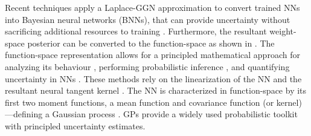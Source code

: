 \documentclass{article}
\makeatletter
\newcommand{\eg}{\textit{e.g.\@}\xspace}
\newcommand{\our}{\textsc{sfr}\xspace}
\makeatother
\begin{document}
\begin{figure}[t!]
  \vspace*{-1em}
\end{figure}


Recent techniques  \citep[\eg,][]{ritter2018kfac,khan2019approximate,daxberger2021laplace,fortuin2021bayesian,immer2021scalable} apply a Laplace-GGN approximation to convert trained NNs into Bayesian neural networks (BNNs), that can provide uncertainty without sacrificing additional resources to training \citep{foong2019between}. Furthermore, the resultant weight-space posterior can be converted to the function-space as shown in \citet{khan2019approximate, immer2021improving}. The function-space representation allows for a principled mathematical approach for analyzing its behaviour \citep{cho2009kernel,meronen2020stationary}, performing probabilistic inference \citep{khan2019approximate}, and quantifying uncertainty in NNs \citep{foong2019between}. These methods rely on the linearization of the NN and the resultant neural tangent kernel \citep[NTK,][]{jacot2018neural}.
The NN is characterized in function-space by its first two moment functions, a mean function and covariance function (or kernel)---defining a Gaussian process \citep[GP,][]{rasmussen2006gaussian}. GPs provide a widely used probabilistic toolkit with principled uncertainty estimates.
\end{document}
